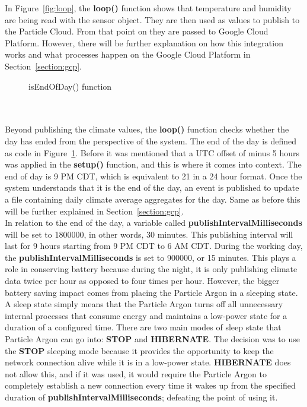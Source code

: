\documentclass{article}
\begin{document}
In Figure~\ref{fig:loop}, the \textbf{loop()} function shows that temperature and humidity are being read with the sensor object. They are then used as values to publish to the Particle Cloud. From that point on they are passed to Google Cloud Platform. However, there will be further explanation on how this integration works and what processes happen on the Google Cloud Platform in Section~\ref{section:gcp}.

\begin{minipage}[c]{\textwidth}
	\begin{figure}[H]
		
		\caption{isEndOfDay() function}
		\label{fig:endofday}
	\end{figure}
\end{minipage}\ \\\\

Beyond publishing the climate values, the \textbf{loop()} function checks whether the day has ended from the perspective of the system. The end of the day is defined as code in Figure~\ref{fig:endofday}. Before it was mentioned that a UTC offset of minus 5 hours was applied in the \textbf{setup()} function, and this is where it comes into context. The end of day is 9 PM CDT, which is equivalent to 21 in a 24 hour format. Once the system understands that it is the end of the day, an event is published to update a file containing daily climate average aggregates for the day. Same as before this will be further explained in Section~\ref{section:gcp}.\\

In relation to the end of the day, a variable called \textbf{publishIntervalMilliseconds} will be set to 1800000, in other words, 30 minutes. This publishing interval will last for 9 hours starting from 9 PM CDT to 6 AM CDT. During the working day, the \textbf{publishIntervalMilliseconds} is set to 900000, or 15 minutes. This plays a role in conserving battery because during the night, it is only publishing climate data twice per hour as opposed to four times per hour. However, the bigger battery saving impact comes from placing the Particle Argon in a sleeping state.\\

A sleep state simply means that the Particle Argon turns off all unnecessary internal processes that consume energy and maintains a low-power state for a duration of a configured time. There are two main modes of sleep state that Particle Argon can go into: \textbf{STOP} and \textbf{HIBERNATE}. The decision was to use the \textbf{STOP} sleeping mode because it provides the opportunity to keep the network connection alive while it is in a low-power state. \textbf{HIBERNATE} does not allow this, and if it was used, it would require the Particle Argon to completely establish a new connection every time it wakes up from the specified duration of \textbf{publishIntervalMilliseconds}; defeating the point of using it.
\end{document}
